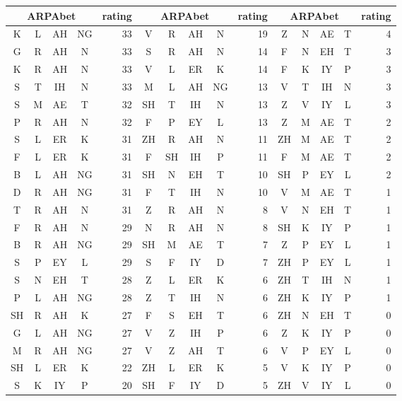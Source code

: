 \begin{center}
\begin{longtable}{c@{ } c@{ } c@{ } c r | c@{ } c@{ } c@{ } c r | c@{ } c@{ } c@{ } c r} \toprule
\multicolumn{4}{c}{ARPAbet} & rating & \multicolumn{4}{c}{ARPAbet} & rating & \multicolumn{4}{c}{ARPAbet} & rating \\ 
\midrule
 K &  L & AH & NG & 33 &  V &  R & AH &  N & 19 &  Z & N & AE & T & 4 \\
 G &  R & AH &  N & 33 &  S &  R & AH &  N & 14 &  F & N & EH & T & 3 \\
 K &  R & AH &  N & 33 &  V &  L & ER &  K & 14 &  F & K & IY & P & 3 \\
 S &  T & IH &  N & 33 &  M &  L & AH & NG & 13 &  V & T & IH & N & 3 \\
 S &  M & AE &  T & 32 & SH &  T & IH &  N & 13 &  Z & V & IY & L & 3 \\
 P &  R & AH &  N & 32 &  F &  P & EY &  L & 13 &  Z & M & AE & T & 2 \\
 S &  L & ER &  K & 31 & ZH &  R & AH &  N & 11 & ZH & M & AE & T & 2 \\
 F &  L & ER &  K & 31 &  F & SH & IH &  P & 11 &  F & M & AE & T & 2 \\
 B &  L & AH & NG & 31 & SH &  N & EH &  T & 10 & SH & P & EY & L & 2 \\
 D &  R & AH & NG & 31 &  F &  T & IH &  N & 10 &  V & M & AE & T & 1 \\
 T &  R & AH &  N & 31 &  Z &  R & AH &  N &  8 &  V & N & EH & T & 1 \\
 F &  R & AH &  N & 29 &  N &  R & AH &  N &  8 & SH & K & IY & P & 1 \\
 B &  R & AH & NG & 29 & SH &  M & AE &  T &  7 &  Z & P & EY & L & 1 \\
 S &  P & EY &  L & 29 &  S &  F & IY &  D &  7 & ZH & P & EY & L & 1 \\
 S &  N & EH &  T & 28 &  Z &  L & ER &  K &  6 & ZH & T & IH & N & 1 \\
 P &  L & AH & NG & 28 &  Z &  T & IH &  N &  6 & ZH & K & IY & P & 1 \\
SH &  R & AH &  K & 27 &  F &  S & EH &  T &  6 & ZH & N & EH & T & 0 \\
 G &  L & AH & NG & 27 &  V &  Z & IH &  P &  6 &  Z & K & IY & P & 0 \\
 M &  R & AH & NG & 27 &  V &  Z & AH &  T &  6 &  V & P & EY & L & 0 \\
SH &  L & ER &  K & 22 & ZH &  L & ER &  K &  5 &  V & K & IY & P & 0 \\
S  &  K & IY &  P & 20 & SH &  F & IY &  D &  5 & ZH & V & IY & L & 0 \\
\bottomrule
\end{longtable}
\end{center}

